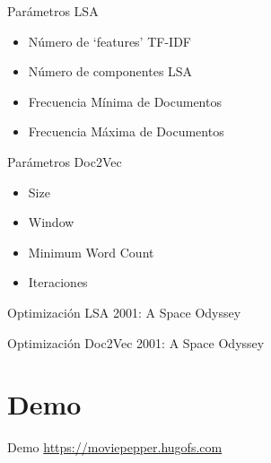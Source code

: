 \documentclass[table]{beamer}
\begin{document}
  \begin{frame}{Parámetros LSA}
      \begin{itemize}
          \item Número de `features' TF-IDF
          \item Número de componentes LSA
          \item Frecuencia Mínima de Documentos
          \item Frecuencia Máxima de Documentos
      \end{itemize}
  \end{frame}

  \begin{frame}{Parámetros Doc2Vec}
      \begin{itemize}
          \item Size
          \item Window
          \item Minimum Word Count
          \item Iteraciones
      \end{itemize}
  \end{frame}

  \begin{frame}{Optimización LSA 2001: A Space Odyssey}
      \tiny
      \centering
      
  \end{frame}

  \begin{frame}{Optimización Doc2Vec 2001: A Space Odyssey}
      \tiny
      \centering
      
  \end{frame}

  \section{Demo}

  \begin{frame}{Demo}
      \url{https://moviepepper.hugofs.com}
  \end{frame}
\end{document}
